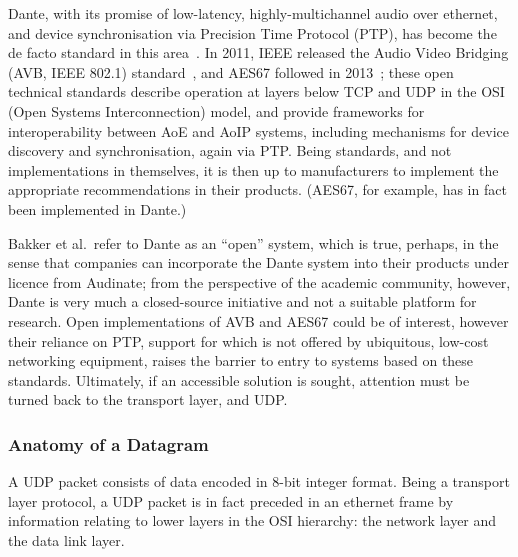 Dante, with its promise of low-latency, highly-multichannel audio over ethernet,
and device synchronisation via Precision Time Protocol (PTP), has become the de
facto standard in this area~\citep{bakker_introduction_2014}.
In 2011, IEEE released the Audio Video Bridging (AVB, IEEE 802.1)
standard~\citep{ieee_ieee_2011}, and AES67 followed in
2013~\citep{hildebrand_aes67-2013_2014};
these open technical standards describe operation at layers below TCP and UDP
in the OSI (Open Systems Interconnection) model, and provide frameworks for
interoperability between AoE and AoIP systems, including mechanisms for device
discovery and synchronisation, again via PTP\@.
Being standards, and not implementations in themselves, it is then up to
manufacturers to implement the appropriate recommendations in their products.
(AES67, for example, has in fact been implemented in Dante.)

Bakker et al.\ refer to Dante as an ``open'' system, which is true, perhaps, in
the sense that companies can incorporate the Dante system into their products
under licence from Audinate;
from the perspective of the academic community, however, Dante is very much a
closed-source initiative and not a suitable platform for research.
Open implementations of AVB and AES67 could be of interest, however their
reliance on PTP, support for which is not offered by ubiquitous, low-cost
networking equipment, raises the barrier to entry to systems based on these
standards.
Ultimately, if an accessible solution is sought, attention must be turned back
to the transport layer, and UDP\@.

\subsubsection{Anatomy of a Datagram}\label{subsubsec:anatomy-of-a-datagram}



A UDP packet consists of data encoded in 8-bit integer format.
Being a transport layer protocol, a UDP packet is in fact preceded in an
ethernet frame by information relating to lower layers in the OSI hierarchy: the
network layer and the data link layer.

